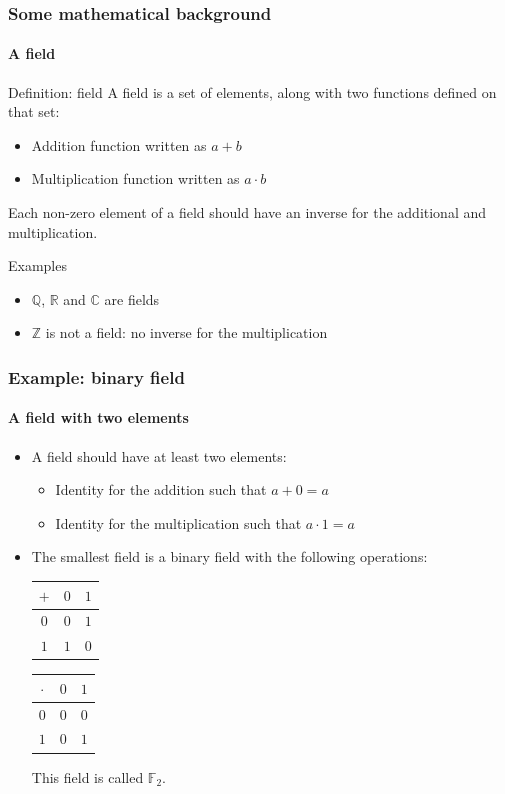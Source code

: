 \documentclass{beamer}
\begin{document}
  \begin{frame}
  	\frametitle{Some mathematical background}
	\framesubtitle{A field}
	\begin{block}{Definition: field}
		A field is a set of elements, along with two functions defined on that set: 
		\begin{itemize}
			\item Addition function written as $a + b$
			\item Multiplication function written as $a \cdot b$
		\end{itemize}
		Each non-zero element of a field should have an inverse for the additional and multiplication.
	\end{block}
	\begin{exampleblock}{Examples}
		\begin{itemize}
			\item $\mathbb{Q}$, $\mathbb{R}$ and $\mathbb{C}$ are fields
			\item $\mathbb{Z}$ is not a field: no inverse for the multiplication
		\end{itemize}
	\end{exampleblock}
  \end{frame}
  \begin{frame}
  	\frametitle{Example: binary field}
	\framesubtitle{A field with two elements}
	\begin{itemize}
		\item A field should have at least two elements:
		\begin{itemize}
			\item Identity for the addition such that $a + 0 = a$
			\item Identity for the multiplication such that $a \cdot 1 = a$
		\end{itemize}
		\item The smallest field is a binary field with the following operations:

	\begin{center}
		\begin{tabular}{c | c c} 
 			$+$ & $0$ & $1$ \\ 
			\hline
 			$0$ & $0$ & $1$ \\ 
 			$1$ & $1$ & $0$
		\end{tabular}
		\qquad\qquad
		\begin{tabular}{c | c c} 
 			$\cdot$ & $0$ & $1$ \\ 
			\hline
 			$0$ & $0$ & $0$ \\ 
 			$1$ & $0$ & $1$
		\end{tabular}
	\end{center}
	This field is called $\mathbb{F}_2$.
		\end{itemize}
  \end{frame}
\end{document}

